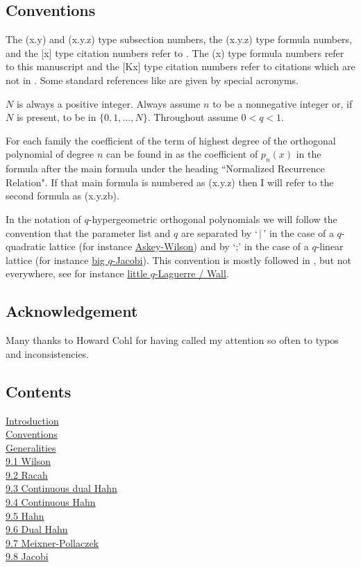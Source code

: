 \documentclass[twoside,11pt]{article}
\newcommand\sa{\smallskipamount}
\newcommand\sLP{\\[\sa]}
\begin{document}
\subsection*{Conventions}
\label{sec_conv}
The (x.y) and (x.y.z) type subsection numbers, the
(x.y.z) type formula numbers, and the [x] type citation numbers
refer to .
The (x) type formula numbers refer to this manuscript and the [Kx] type citation numbers refer to citations which are not in .
Some standard references like 
are given by special acronyms.

$N$ is always a positive integer. Always assume $n$ to be a nonnegative
integer or, if $N$ is present, to be in $\{0,1,\ldots,N\}$.
Throughout assume $0<q<1$.

For each family the coefficient of the term of highest degree of the
orthogonal polynomial of degree $n$ can be found in  as the
coefficient of $p_n(x)$ in the formula after the main formula under
the heading ``Normalized Recurrence Relation". If that main formula is numbered
as (x.y.z) then I will refer to the second formula as (x.y.zb).

In the notation of $q$-hypergeometric orthogonal polynomials we
will follow the convention that the parameter list and $q$ are separated
by `$\,|\,$' in the case of a $q$-quadratic lattice (for instance
\hyperref[sec14.1]{Askey-Wilson})
and by `;' in the case of a $q$-linear lattice (for instance
\hyperref[sec14.5]{big $q$-Jacobi}). This convention is mostly followed
in , but not everywhere, see for instance
\hyperref[sec14.20]{little $q$-Laguerre / Wall}.
%
\subsection*{Acknowledgement}
Many thanks to Howard Cohl for having called my attention so often to typos and
inconsistencies.
%
\newpage
\subsection*{Contents}
\hyperref[sec_intro]{Introduction}\\
\hyperref[sec_conv]{Conventions}\\
\hyperref[sec_general]{Generalities}
\sLP
\hyperref[sec9.1]{9.1 Wilson}\\
\hyperref[sec9.2]{9.2 Racah}\\
\hyperref[sec9.3]{9.3 Continuous dual Hahn}\\
\hyperref[sec9.4]{9.4 Continuous Hahn}\\
\hyperref[sec9.5]{9.5 Hahn}\\
\hyperref[sec9.6]{9.6 Dual Hahn}\\
\hyperref[sec9.7]{9.7 Meixner-Pollaczek}\\
\hyperref[sec9.8]{9.8 Jacobi}
\end{document}

